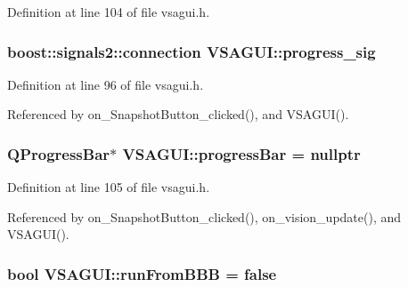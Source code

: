 Definition at line 104 of file vsagui.\+h.

\hypertarget{class_v_s_a_g_u_i_a3503e0415ff202c93fc4d7ee5c6f4fb8}{}
\subsubsection[{progress\+\_\+sig}]{\setlength{\rightskip}{0pt plus 5cm}boost\+::signals2\+::connection V\+S\+A\+G\+U\+I\+::progress\+\_\+sig\hspace{0.3cm}{\ttfamily [private]}}\label{class_v_s_a_g_u_i_a3503e0415ff202c93fc4d7ee5c6f4fb8}


Definition at line 96 of file vsagui.\+h.



Referenced by on\+\_\+\+Snapshot\+Button\+\_\+clicked(), and V\+S\+A\+G\+U\+I().

\hypertarget{class_v_s_a_g_u_i_a17b71e08eeff21b28e3816ec5482473c}{}
\subsubsection[{progress\+Bar}]{\setlength{\rightskip}{0pt plus 5cm}Q\+Progress\+Bar$\ast$ V\+S\+A\+G\+U\+I\+::progress\+Bar = nullptr\hspace{0.3cm}{\ttfamily [private]}}\label{class_v_s_a_g_u_i_a17b71e08eeff21b28e3816ec5482473c}


Definition at line 105 of file vsagui.\+h.



Referenced by on\+\_\+\+Snapshot\+Button\+\_\+clicked(), on\+\_\+vision\+\_\+update(), and V\+S\+A\+G\+U\+I().

\hypertarget{class_v_s_a_g_u_i_ad093d6fc67a6ad9e27948023ddba775d}{}
\subsubsection[{run\+From\+B\+B\+B}]{\setlength{\rightskip}{0pt plus 5cm}bool V\+S\+A\+G\+U\+I\+::run\+From\+B\+B\+B = false\hspace{0.3cm}{\ttfamily [private]}}\label{class_v_s_a_g_u_i_ad093d6fc67a6ad9e27948023ddba775d}


